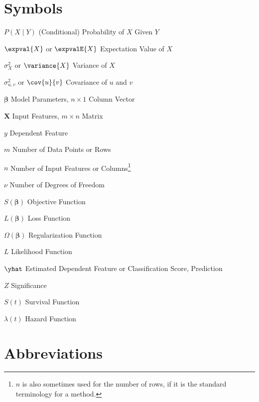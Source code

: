 \abbreviations

\section*{Symbols}

\begin{symbollist}
  \item[$P\left(X \mid Y\right)$] (Conditional) Probability of $X$ Given $Y$
  \item[$\expval{X}$ or $\expvalE{X}$] Expectation Value of $X$
  \item[$\sigma_{X}^{2}$ or $\variance{X}$] Variance of $X$
  \item[$\sigma_{u,v}^{2}$ or $\cov{u}{v}$] Covariance of $u$ and $v$
  \item[$\bm{\beta}$] Model Parameters, $n \times 1$ Column Vector
  \item[$\mathbf{X}$] Input Features, $m \times n$ Matrix
  \item[$y$] Dependent Feature
  \item[$m$] Number of Data Points or Rows
  \item[$n$] Number of Input Features or Columns\footnote{$n$ is also sometimes used for the number of rows, if it is the standard terminology for a method.}
  \item[$\nu$] Number of Degrees of Freedom
  \item[$S\left(\bm{\beta}\right)$] Objective Function
  \item[$L\left(\bm{\beta}\right)$] Loss Function
  \item[$\Omega\left(\bm{\beta}\right)$] Regularization Function
  \item[$L$] Likelihood Function
  \item[$\yhat$] Estimated Dependent Feature or Classification Score, Prediction
  \item[$Z$] Significance
  \item[$S\left(t\right)$] Survival Function
  \item[$\lambda\left(t\right)$] Hazard Function
\end{symbollist}

\clearpage
\section*{Abbreviations}


